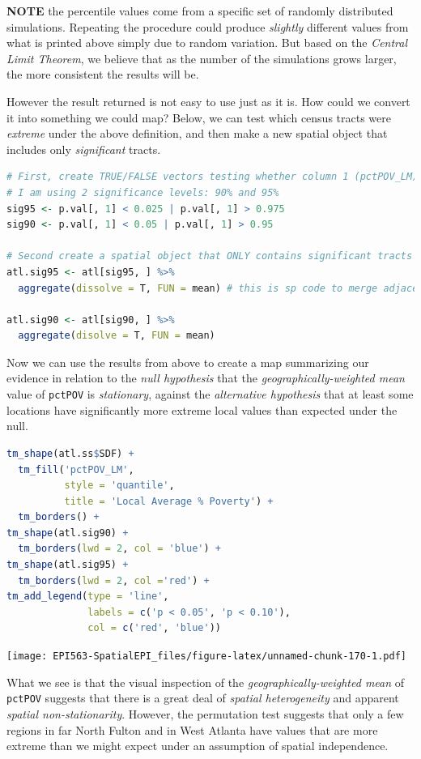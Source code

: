 \documentclass[
]{book}
\newcommand{\passthrough}[1]{#1}
\begin{document}
\textbf{NOTE} the percentile values come from a specific set of randomly distributed simulations. Repeating the procedure could produce \emph{slightly} different values from what is printed above simply due to random variation. But based on the \emph{Central Limit Theorem}, we believe that as the number of the simulations grows larger, the more consistent the results will be.

However the result returned is not easy to use just as it is. How could we convert it into something we could map? Below, we can test which census tracts were \emph{extreme} under the above definition, and then make a new spatial object that includes only \emph{significant} tracts.

\begin{lstlisting}[language=R]
# First, create TRUE/FALSE vectors testing whether column 1 (pctPOV_LM) is extreme
# I am using 2 significance levels: 90% and 95%
sig95 <- p.val[, 1] < 0.025 | p.val[, 1] > 0.975
sig90 <- p.val[, 1] < 0.05 | p.val[, 1] > 0.95

# Second create a spatial object that ONLY contains significant tracts
atl.sig95 <- atl[sig95, ] %>% 
  aggregate(dissolve = T, FUN = mean) # this is sp code to merge adjacent tracts

atl.sig90 <- atl[sig90, ] %>%
  aggregate(disolve = T, FUN = mean)
\end{lstlisting}

Now we can use the results from above to create a map summarizing our evidence in relation to the \emph{null hypothesis} that the \emph{geographically-weighted mean} value of \passthrough{\lstinline!pctPOV!} is \emph{stationary}, against the \emph{alternative hypothesis} that at least some locations have significantly more extreme local values than expected under the null.

\begin{lstlisting}[language=R]
tm_shape(atl.ss$SDF) + 
  tm_fill('pctPOV_LM', 
          style = 'quantile',
          title = 'Local Average % Poverty') + 
  tm_borders() + 
tm_shape(atl.sig90) +
  tm_borders(lwd = 2, col = 'blue') + 
tm_shape(atl.sig95) + 
  tm_borders(lwd = 2, col ='red') +
tm_add_legend(type = 'line',
              labels = c('p < 0.05', 'p < 0.10'),
              col = c('red', 'blue'))
\end{lstlisting}

\texttt{[image: EPI563-SpatialEPI\_files/figure-latex/unnamed-chunk-170-1.pdf]}

What we see is that the visual inspection of the \emph{geographically-weighted mean} of \passthrough{\lstinline!pctPOV!} suggests that there is a great deal of \emph{spatial heterogeneity} and apparent \emph{spatial non-stationarity}. However, the permutation test suggests that only a few regions in far North Fulton and in West Atlanta have values that are more extreme than we might expect under an assumption of spatial independence.
\end{document}

